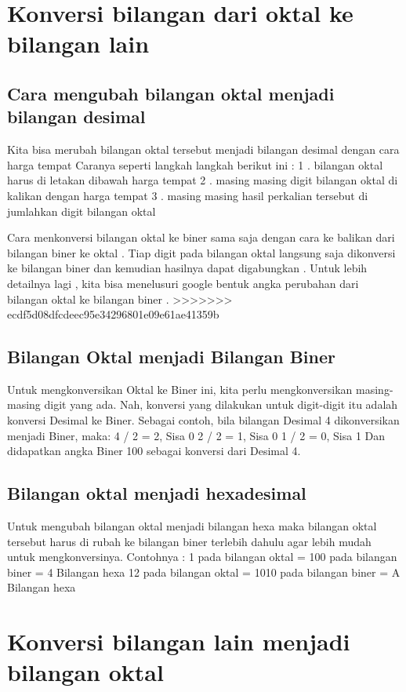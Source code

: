\section{Konversi bilangan dari oktal ke bilangan lain}
	\subsection{Cara mengubah bilangan oktal menjadi bilangan desimal}

	Kita bisa merubah bilangan oktal tersebut menjadi bilangan desimal dengan cara harga tempat
	Caranya seperti langkah langkah berikut ini :
	1 . bilangan oktal harus di letakan dibawah harga tempat
	2 . masing masing digit bilangan oktal di kalikan dengan harga tempat
	3 . masing masing hasil perkalian tersebut di jumlahkan digit bilangan oktal  
	
	Cara menkonversi bilangan oktal ke biner sama saja dengan cara ke balikan dari bilangan biner ke oktal . Tiap digit pada bilangan oktal langsung saja dikonversi ke bilangan biner dan kemudian hasilnya dapat digabungkan . Untuk lebih detailnya lagi , kita bisa menelusuri google bentuk angka perubahan dari bilangan oktal ke bilangan biner .
	>>>>>>> ecdf5d08dfcdeec95e34296801e09e61ae41359b

	\subsection {Bilangan Oktal menjadi Bilangan Biner}
	Untuk mengkonversikan Oktal ke Biner ini, kita perlu mengkonversikan masing-masing digit yang ada. Nah, konversi yang dilakukan untuk digit-digit itu adalah konversi Desimal ke Biner. Sebagai contoh, bila bilangan Desimal 4 dikonversikan menjadi Biner, maka:
	4  / 2 = 2, Sisa 0
	2 / 2 = 1, Sisa 0
	1 / 2 = 0, Sisa 1
	Dan didapatkan angka Biner 100 sebagai konversi dari Desimal 4.

	\subsection{Bilangan oktal menjadi hexadesimal}
	Untuk mengubah bilangan oktal menjadi bilangan hexa maka bilangan oktal tersebut harus di rubah ke bilangan biner terlebih dahulu agar lebih mudah untuk mengkonversinya.
Contohnya :
1 pada bilangan oktal = 100 pada bilangan biner = 4 Bilangan hexa
12 pada bilangan oktal = 1010 pada bilangan biner = A Bilangan hexa

\section {Konversi bilangan lain menjadi bilangan oktal}
	
